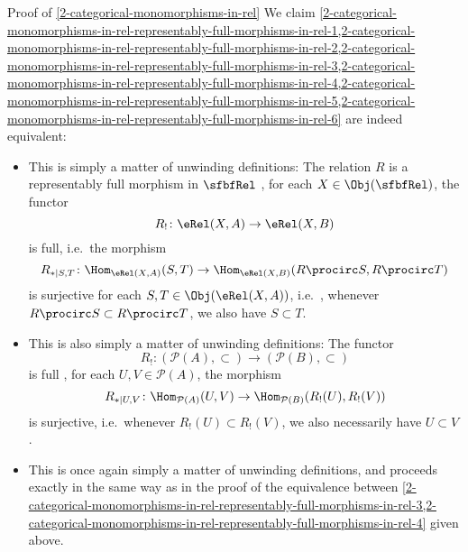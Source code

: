 \begin{Proof}{Proof of \cref{2-categorical-monomorphisms-in-rel}}
    We claim \cref{2-categorical-monomorphisms-in-rel-representably-full-morphisms-in-rel-1,2-categorical-monomorphisms-in-rel-representably-full-morphisms-in-rel-2,2-categorical-monomorphisms-in-rel-representably-full-morphisms-in-rel-3,2-categorical-monomorphisms-in-rel-representably-full-morphisms-in-rel-4,2-categorical-monomorphisms-in-rel-representably-full-morphisms-in-rel-5,2-categorical-monomorphisms-in-rel-representably-full-morphisms-in-rel-6} are indeed equivalent:
    \begin{itemize}
        \item{}This is simply a matter of unwinding definitions: The relation $R$ is a representably full morphism in $\sfbfRel$ \textiff, for each $X\in\Obj(\sfbfRel)$, the functor
            \[
                R_{!}%
                \colon%
                \eRel(X,A)%
                \to%
                \eRel(X,B)%
            \]%
            is full, i.e.\ \textiff the morphism
            \[
                R_{*|S,T}%
                \colon%
                \Hom_{\eRel(X,A)}(S,T)%
                \to%
                \Hom_{\eRel(X,B)}(R\procirc S,R\procirc T)%
            \]%
            is surjective for each $S,T\in\Obj(\eRel(X,A))$, i.e.\ \textiff, whenever $R\procirc S\subset R\procirc T$, we also have $S\subset T$.
        \item{}This is also simply a matter of unwinding definitions: The functor
            \[
                R_{!}%
                \colon%
                (\mathcal{P}(A),\subset)%
                \to%
                (\mathcal{P}(B),\subset)%
            \]%
            is full \textiff, for each $U,V\in\mathcal{P}(A)$, the morphism
            \[
                R_{*|U,V}%
                \colon%
                \Hom_{\mathcal{P}(A)}(U,V)%
                \to%
                \Hom_{\mathcal{P}(B)}(R_{!}(U),R_{!}(V))%
            \]%
            is surjective, i.e.\ \textiff whenever $R_{!}(U)\subset R_{!}(V)$, we also necessarily have $U\subset V$.
        \item{}This is once again simply a matter of unwinding definitions, and proceeds exactly in the same way as in the proof of the equivalence between \cref{2-categorical-monomorphisms-in-rel-representably-full-morphisms-in-rel-3,2-categorical-monomorphisms-in-rel-representably-full-morphisms-in-rel-4} given above.

\end{itemize}
\end{Proof}
